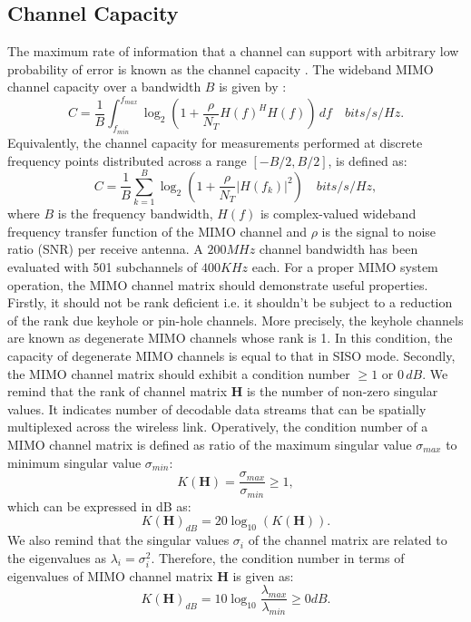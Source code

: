 \documentclass[10pt, final, journal, letterpaper, oneside, twocolumn]{IEEEtran}
\begin{document}
\subsection{Channel Capacity}
The maximum rate of information that a channel can support with arbitrary low probability of error is known as the channel capacity \cite{chuah2002capacity}. 
The wideband MIMO channel capacity over a bandwidth $B$ is given by \cite{molisch2002capacity}\cite{tse2005fundamentals}:
\begin{equation}
    C=\frac{1}{B}\int_{f_{min}}^{f_{max}}\log_2\left(1+\frac{\rho}{N_T} H(f)^HH(f)\right)\,df \quad bits/s/Hz.
\end{equation}
Equivalently, the channel capacity for measurements performed at discrete frequency points distributed across a range $[-B/2,B/2]$, is defined as:
\begin{equation}
    C=\frac{1}{B}\sum_{k=1}^{B}\log_2\left(1+\frac{\rho}{N_T} |H(f_k)|^2 \right)\quad bits/s/Hz,
\end{equation}
where $B$ is the frequency bandwidth, $H(f)$ is complex-valued wideband frequency transfer function of the MIMO channel and $\rho$ is the signal to noise ratio (SNR) per receive antenna. A $200 MHz$ channel bandwidth has been evaluated with 501 subchannels of $400 KHz$ each. For a proper MIMO system operation, the MIMO channel matrix should demonstrate useful properties. Firstly, it should not be rank deficient i.e. it shouldn't be subject to a reduction of the rank due keyhole or pin-hole channels. More precisely, the keyhole channels are known as degenerate MIMO channels whose rank is 1. In this condition, the capacity of degenerate MIMO channels is equal to that in SISO mode. Secondly, the MIMO channel matrix should exhibit a condition number $\geq 1$ or $0\,dB$. We remind that the rank of channel matrix $\mathbf{H}$ is the number of non-zero singular values. It indicates number of decodable data streams that can be spatially multiplexed across the wireless link. Operatively, the condition number of a MIMO channel matrix is defined as ratio of the maximum singular value $\sigma_{max}$ to minimum singular value $\sigma_{min}$:
\begin{equation}
    K(\mathbf{H})=\frac{\sigma_{max}}{\sigma_{min}}\geq 1, 
\end{equation}
which can be expressed in dB as:
\begin{equation}
    K(\mathbf{H})_{dB}=20\log_{10}\left( K(\mathbf{H})\right).
\end{equation}
We also remind that the singular values $\sigma_i$ of the channel matrix are related to the eigenvalues as $\lambda_i=\sigma_{i}^{2}$. Therefore, the condition number in terms of eigenvalues of MIMO channel matrix $\mathbf{H}$ is given as:
\begin{equation}
    K(\mathbf{H})_{dB}=10\log_{10}\frac{\lambda_{max}}{\lambda_{min}}\geq 0 dB.
\end{equation}
\end{document}
